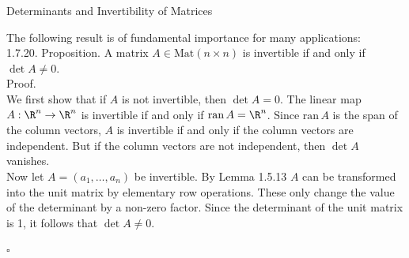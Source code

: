 \documentclass[smaller,hyperref={CJKbookmarks=true}]{beamer}
\begin{document}
\begin{frame}[t]{Determinants and Invertibility of Matrices}
\begin{spacing}{1.05}
The following result is of fundamental importance for many applications:\\[7pt]
\alert{1.7.20. Proposition.} A matrix $A\in\text{Mat}(n\times n)$ is invertible if and only if $\det A\neq 0$.\\[8pt]
\alert{Proof.}\\
We first show that if $A$ is not invertible, then $\det A=0$. The linear map $A:\R^n\to\R^n$ is invertible if and only if $\text{ran}\,A=\R^n$. Since $\text{ran}\,A$ is the span of the column vectors, $A$ is invertible if and only if the column vectors are independent. But if the column vectors are not independent, then $\det A$ vanishes.\\[7pt]
Now let $A=(a_1,\ldots,a_n)$ be invertible. By Lemma 1.5.13 $A$ can be transformed into the unit matrix by elementary row operations. These only change the value of the determinant by a non-zero factor. Since the determinant of the unit matrix is 1, it follows that $\det A\neq 0$.
\begin{flushright}
  $\square$
\end{flushright}
\end{spacing}
\end{frame}
\end{document}
